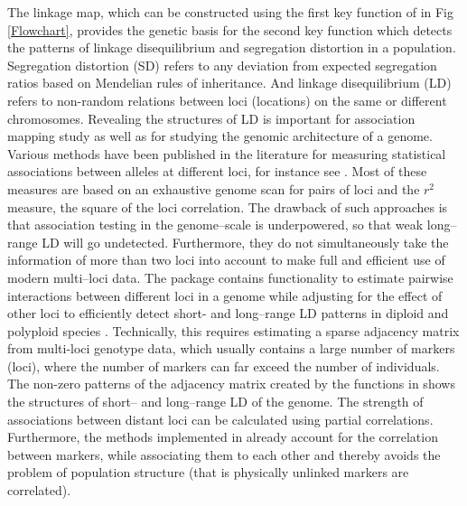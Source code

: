 The linkage map,  which can be constructed using the first key function of  in Fig \ref{Flowchart}, provides the genetic basis for the second key function which detects the patterns of linkage disequilibrium and segregation distortion in a population. Segregation distortion (SD) refers to any deviation from expected segregation ratios based on Mendelian rules of inheritance. %
And linkage disequilibrium (LD) refers to non-random relations between loci (locations) on the same or different chromosomes.
Revealing the structures of LD is important for association mapping study as well as for studying the genomic architecture of a genome. Various methods have been published in the literature for measuring statistical associations between alleles at different loci, for instance see \citet{hedrick1987gametic, mangin2012novel, clarke2011basic, bush2012chapter, kaler2020comparing}. Most of these measures are based on an exhaustive genome scan for pairs of loci and the $r^2$ measure,  the square of the loci correlation. The drawback of such approaches is that association testing in the genome--scale is underpowered, so that weak long--range LD will go undetected. Furthermore, they do not simultaneously take the information of more than two loci into account to make full and efficient use of modern multi--loci data.
The  package contains functionality to estimate pairwise interactions between different loci in a genome while adjusting for the effect of other loci to efficiently detect short- and long--range LD patterns in diploid and polyploid species \citep{behrouzi2019detecting}. Technically, this requires estimating a sparse adjacency matrix from multi-loci genotype data, which usually contains a large number of markers (loci), where the number of markers can far exceed the number of individuals. The non-zero patterns of the adjacency matrix created by the functions in  shows the structures of short-- and long--range LD of the genome. The strength of associations between distant loci can be calculated using partial correlations. Furthermore, the methods implemented in  already account for the correlation between markers, while associating them to each other and thereby avoids the problem of population structure (that is physically unlinked markers are correlated). %


